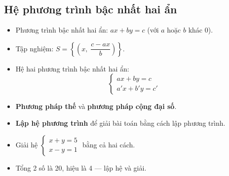 \documentclass[12pt,a4paper]{article}
\begin{document}
\subsection{Hệ phương trình bậc nhất hai ẩn}

\begin{dinhnghia}
  \begin{itemize}
    \item Phương trình bậc nhất hai ẩn: $ax + by = c$ \quad (với $a$ hoặc $b$ khác $0$).
    \item Tập nghiệm: $S = \left\{\!\left(x,\; \dfrac{c - ax}{b}\right)\right\}$.
    \item Hệ hai phương trình bậc nhất hai ẩn:
    \[\begin{cases} ax + by = c \\ a'x + b'y = c' \end{cases}\]
  \end{itemize}
\end{dinhnghia}

\begin{phuongphap}
  \begin{itemize}
    \item \textbf{Phương pháp thế} và \textbf{phương pháp cộng đại số}.
    \item \textbf{Lập hệ phương trình} để giải bài toán bằng cách lập phương trình.
  \end{itemize}
\end{phuongphap}

\begin{vidu}
  \begin{itemize}
    \item Giải hệ $\begin{cases} x + y = 5 \\ x - y = 1 \end{cases}$ bằng cả hai cách.
    \item Tổng 2 số là 20, hiệu là 4 --- lập hệ và giải.
  \end{itemize}
\end{vidu}
\end{document}
